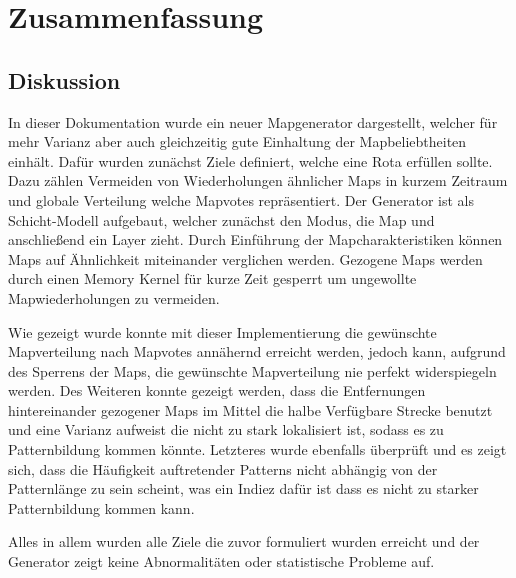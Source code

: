 \section{Zusammenfassung}
    \subsection{Diskussion}
    	In dieser Dokumentation wurde ein neuer Mapgenerator dargestellt, welcher für mehr Varianz aber auch gleichzeitig gute Einhaltung der Mapbeliebtheiten einhält.
        Dafür wurden zunächst Ziele definiert, welche eine Rota erfüllen sollte. 
        Dazu zählen Vermeiden von Wiederholungen ähnlicher Maps in kurzem Zeitraum und globale Verteilung welche Mapvotes repräsentiert.
        Der Generator ist als Schicht-Modell aufgebaut, welcher zunächst den Modus, die Map und anschließend ein Layer zieht. 
        Durch Einführung der Mapcharakteristiken können Maps auf Ähnlichkeit miteinander verglichen werden.
        Gezogene Maps werden durch einen Memory Kernel für kurze Zeit gesperrt um ungewollte Mapwiederholungen zu vermeiden.
        
        Wie gezeigt wurde konnte mit dieser Implementierung die gewünschte Mapverteilung nach Mapvotes annähernd erreicht werden, 
        jedoch kann, aufgrund des Sperrens der Maps, die gewünschte Mapverteilung nie perfekt widerspiegeln werden.
        Des Weiteren konnte gezeigt werden,
        dass die Entfernungen hintereinander gezogener Maps im Mittel die halbe Verfügbare Strecke benutzt und eine Varianz aufweist die nicht zu stark lokalisiert ist, 
        sodass es zu Patternbildung kommen könnte.
        Letzteres wurde ebenfalls überprüft und es zeigt sich, 
        dass die Häufigkeit auftretender Patterns nicht abhängig von der Patternlänge zu sein scheint, was ein Indiez dafür ist dass es nicht zu starker Patternbildung kommen kann. 

        Alles in allem wurden alle Ziele die zuvor formuliert wurden erreicht und der Generator zeigt keine Abnormalitäten oder statistische Probleme auf.

